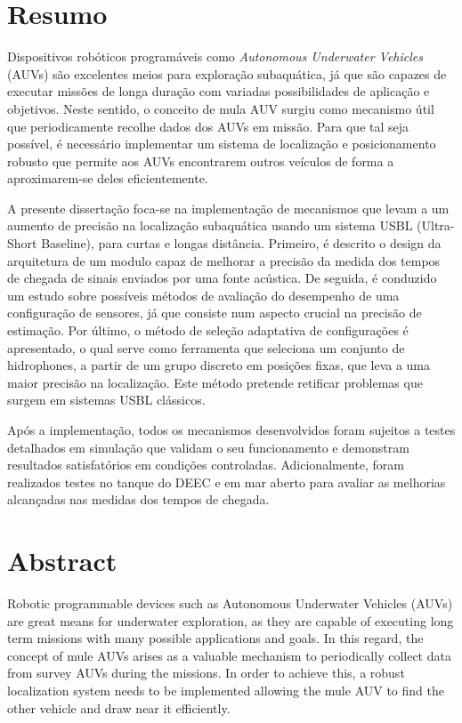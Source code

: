 \chapter*{Resumo}
Dispositivos robóticos programáveis como \textit{Autonomous Underwater Vehicles} (AUVs) são excelentes meios para exploração subaquática, já que são capazes de executar missões de longa duração com variadas possibilidades de aplicação e objetivos. Neste sentido, o conceito de mula AUV surgiu como mecanismo útil que periodicamente recolhe dados dos AUVs em missão. Para que tal seja possível, é necessário implementar um sistema de localização e posicionamento robusto que permite aos AUVs encontrarem outros veículos de forma a aproximarem-se deles eficientemente.

A presente dissertação foca-se na implementação de mecanismos que levam a um aumento de precisão na localização subaquática usando um sistema USBL (Ultra-Short Baseline), para curtas e longas distância. Primeiro, é descrito o design da arquitetura de um modulo capaz de melhorar a precisão da medida dos tempos de chegada de sinais enviados por uma fonte acústica. De seguida, é conduzido um estudo sobre possíveis métodos de avaliação do desempenho de uma configuração de sensores, já que consiste num aspecto crucial na precisão de estimação. Por último, o método de seleção adaptativa de configurações é apresentado, o qual serve como ferramenta que seleciona um conjunto de hidrophones, a partir de um grupo discreto em posições fixas, que leva a uma maior precisão na localização. Este método pretende retificar problemas que surgem em sistemas USBL clássicos. 

Após a implementação, todos os mecanismos desenvolvidos foram sujeitos a testes detalhados em simulação que validam o seu funcionamento e demonstram resultados satisfatórios em condições controladas. Adicionalmente, foram realizados testes no tanque do DEEC e em mar aberto para avaliar as melhorias alcançadas nas medidas dos tempos de chegada.

\chapter*{Abstract}
Robotic programmable devices such as Autonomous Underwater Vehicles (AUVs) are great means for underwater exploration, as they are capable of executing long term missions with many possible applications and goals. In this regard, the concept of mule AUVs arises as a valuable mechanism to periodically collect data from survey AUVs during the missions. In order to achieve this, a robust localization system needs to be implemented allowing the mule AUV to find the other vehicle and draw near it efficiently.

